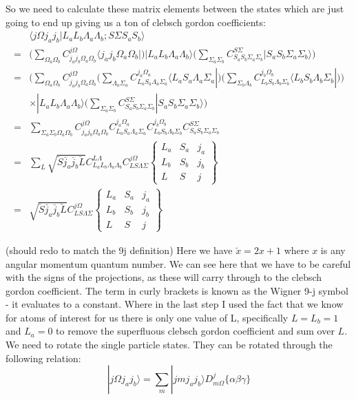 \documentclass[prl, longbibliography]{revtex4-2}
\begin{document}
So we need to calculate these matrix elements between the states which are just going to end up giving us a ton of clebsch gordon coefficients: 
\begin{align}
&\langle j\Omega j_a j_b | L_a L_b \Lambda_a \Lambda_b; S\Sigma S_a S_b\rangle \\
= &\Bigg(\sum_{\Omega_a \Omega_b} C_{j_a j_b \Omega_a \Omega_b}^{j \Omega} \langle j_a j_b \Omega_a \Omega_b |\Bigg)|L_a L_b \Lambda_a \Lambda_b\rangle \Bigg(\sum_{\Sigma_a\Sigma_b} C_{S_a S_b \Sigma_a \Sigma_b}^{S \Sigma}| S_a S_b \Sigma_a \Sigma_b\rangle\Bigg)\\
=&\Bigg(\sum_{\Omega_a \Omega_b}C_{j_a j_b \Omega_a \Omega_b}^{j \Omega}\Big(\sum_{\Lambda_a\Sigma_a} C_{L_a S_a \Lambda_a \Sigma_a}^{j_a \Omega_a}\langle L_a S_a \Lambda_a \Sigma_a |\Big)\Big(\sum_{\Sigma_b\Lambda_b} C_{L_b S_b \Lambda_b \Sigma_b}^{j_b \Omega_b}\langle L_b S_b \Lambda_b \Sigma_b |\Big)\Bigg)\\
&\times|L_a L_b \Lambda_a \Lambda_b\rangle\Bigg(\sum_{\Sigma_a\Sigma_b} C_{S_a S_b \Sigma_a \Sigma_b}^{S \Sigma} | S_a S_b \Sigma_a \Sigma_b\rangle\Bigg)\\
=&\sum_{\Sigma_a \Sigma_b \Omega_a \Omega_b} 
C_{j_a j_b \Omega_a \Omega_b}^{j \Omega} 
C_{L_a S_a \Lambda_a \Sigma_a}^{j_a \Omega_a}
C_{L_b S_b \Lambda_b \Sigma_b}^{j_b \Omega_b} 
C_{S_a S_b \Sigma_a \Sigma_b}^{S \Sigma}\\
=&\sum_{L} \sqrt{\breve{S}\breve{j_a}\breve{j_b}\breve{L}} 
C_{L_a L_b \Lambda_a \Lambda_b}^{L \Lambda}
C_{L S \Lambda \Sigma}^{j \Omega}
\begin{Bmatrix}
L_a & S_a & j_a\\
L_b & S_b & j_b\\
L & S & j
\end{Bmatrix}\\
=&\sqrt{\breve{S}\breve{j_a}\breve{j_b}\breve{L}} 
C_{L S \Lambda \Sigma}^{j \Omega}
\begin{Bmatrix}
L_a & S_a & j_a\\
L_b & S_b & j_b\\
L & S & j
\end{Bmatrix}
\end{align}

(should redo to match the 9j definition) Here we have $\breve{x}=2x+1$ where $x$ is any angular momentum quantum number. We can see here that we have to be careful with the signs of the projections, as these will carry through to the clebsch gordon coefficient.  The term in curly brackets is known as the Wigner 9-j symbol - it evaluates to a constant. Where in the last step I used the fact that we know for atoms of interest for us there is only one value of L, specifically $L=L_b=1$ and $L_a=0$ to remove the superfluous clebsch gordon coefficient and sum over $L$. We need to rotate the single particle states. They can be rotated through the following relation:
\begin{equation}
|j\Omega j_a j_b\rangle = \sum_m |j m j_a j_b\rangle D^j_{m \Omega}\{\alpha\beta\gamma\}
\end{equation}
\end{document}
